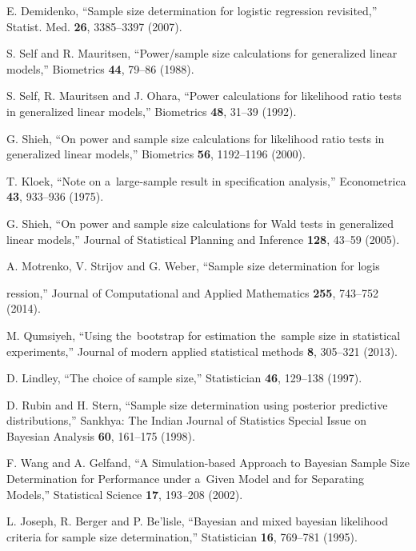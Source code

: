 \documentclass[
11pt,%
tightenlines,%
twoside,%
onecolumn,%
nofloats,%
nobibnotes,%
nofootinbib,%
superscriptaddress,%
noshowpacs,%
centertags]%
{revtex4}
\begin{document}
\begin{thebibliography}{}
	E. Demidenko, ``Sample size determination for logistic regression revisited,'' Statist. Med. \textbf{26}, 3385--3397 (2007).
	
	S. Self and R. Mauritsen, ``Power/sample size calculations for generalized linear models,'' Biometrics \textbf{44}, 79--86 (1988).
	
	S. Self, R. Mauritsen and J. Ohara, ``Power calculations for likelihood ratio tests in generalized linear models,'' Biometrics \textbf{48}, 31--39 (1992).
	
	G. Shieh, ``On power and sample size calculations for likelihood ratio tests in generalized linear models,'' Biometrics \textbf{56}, 1192--1196 (2000).
	
	T. Kloek, ``Note on a~large-sample result in specification analysis,'' Econometrica \textbf{43}, 933--936 (1975).
	
	G. Shieh, ``On power and sample size calculations for Wald tests in generalized linear models,'' Journal of Statistical Planning and Inference \textbf{128}, 43--59 (2005).

	A. Motrenko, V. Strijov and G. Weber, ``Sample size determination for logis
	
	ression,'' Journal of Computational and Applied Mathematics \textbf{255}, 743--752 (2014).
	
	M. Qumsiyeh, ``Using the~bootstrap for estimation the~sample size in statistical experiments,'' Journal of modern applied statistical methods \textbf{8}, 305--321 (2013).
	
	D. Lindley, ``The choice of sample size,'' Statistician \textbf{46}, 129--138 (1997).
	
	D. Rubin and H. Stern, ``Sample size determination using posterior predictive distributions,'' Sankhya: The Indian Journal of Statistics Special Issue on Bayesian Analysis \textbf{60}, 161--175 (1998).

	F. Wang and A. Gelfand, ``A Simulation-based Approach to Bayesian Sample Size Determination for Performance under a~Given Model and for Separating Models,'' Statistical Science \textbf{17}, 193--208 (2002).
	
	L. Joseph, R. Berger and P. Be'lisle, ``Bayesian and mixed bayesian likelihood criteria for sample size determination,'' Statistician \textbf{16}, 769--781 (1995).
	

\end{thebibliography}
\end{document}
